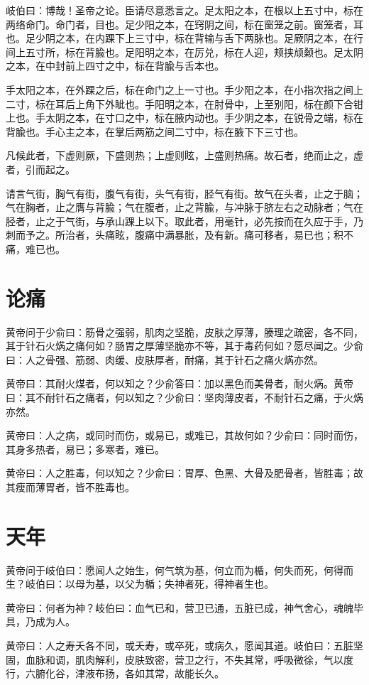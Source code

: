 \documentclass[a4paper,12pt,UTF8,twoside]{ctexbook}
\begin{document}
	岐伯曰：博哉！圣帝之论。臣请尽意悉言之。足太阳之本，在根以上五寸中，标在两络命门。命门者，目也。足少阳之本，在窍阴之间，标在窗笼之前。窗笼者，耳也。足少阴之本，在内踝下上三寸中，标在背输与舌下两脉也。足厥阴之本，在行间上五寸所，标在背腧也。足阳明之本，在厉兑，标在人迎，颊挟颃颡也。足太阴之本，在中封前上四寸之中，标在背腧与舌本也。
	
	手太阳之本，在外踝之后，标在命门之上一寸也。手少阳之本，在小指次指之间上二寸，标在耳后上角下外眦也。手阳明之本，在肘骨中，上至别阳，标在颜下合钳上也。手太阴之本，在寸口之中，标在腋内动也。手少阴之本，在锐骨之端，标在背腧也。手心主之本，在掌后两筋之间二寸中，标在腋下下三寸也。
	
	凡候此者，下虚则厥，下盛则热；上虚则眩，上盛则热痛。故石者，绝而止之，虚者，引而起之。
	
	请言气街，胸气有街，腹气有街，头气有街，胫气有街。故气在头者，止之于脑；气在胸者，止之膺与背腧；气在腹者，止之背腧，与冲脉于脐左右之动脉者；气在胫者，止之于气街，与承山踝上以下。取此者，用毫针，必先按而在久应于手，乃刺而予之。所治者，头痛眩，腹痛中满暴胀，及有新。痛可移者，易已也；积不痛，难已也。
	\chapter{论痛}
	
	黄帝问于少俞曰：筋骨之强弱，肌肉之坚脆，皮肤之厚薄，腠理之疏密，各不同，其于针石火焫之痛何如？肠胃之厚薄坚脆亦不等，其于毒药何如？愿尽闻之。少俞曰：人之骨强、筋弱、肉缓、皮肤厚者，耐痛，其于针石之痛火焫亦然。
	
	黄帝曰：其耐火煤者，何以知之？少俞答曰：加以黑色而美骨者，耐火焫。黄帝曰：其不耐针石之痛者，何以知之？少俞曰：坚肉薄皮者，不耐针石之痛，于火焫亦然。
	
	黄帝曰：人之病，或同时而伤，或易已，或难已，其故何如？少俞曰：同时而伤，其身多热者，易已；多寒者，难已。
	
	黄帝曰：人之胜毒，何以知之？少俞曰：胃厚、色黑、大骨及肥骨者，皆胜毒；故其瘦而薄胃者，皆不胜毒也。
	\chapter{天年}
	
	黄帝问于岐伯曰：愿闻人之始生，何气筑为基，何立而为楯，何失而死，何得而生？岐伯曰：以母为基，以父为楯；失神者死，得神者生也。
	
	黄帝曰：何者为神？岐伯曰：血气已和，营卫已通，五脏已成，神气舍心，魂魄毕具，乃成为人。
	
	黄帝曰：人之寿夭各不同，或夭寿，或卒死，或病久，愿闻其道。岐伯曰：五脏坚固，血脉和调，肌肉解利，皮肤致密，营卫之行，不失其常，呼吸微徐，气以度行，六腑化谷，津液布扬，各如其常，故能长久。
	
\end{document}
